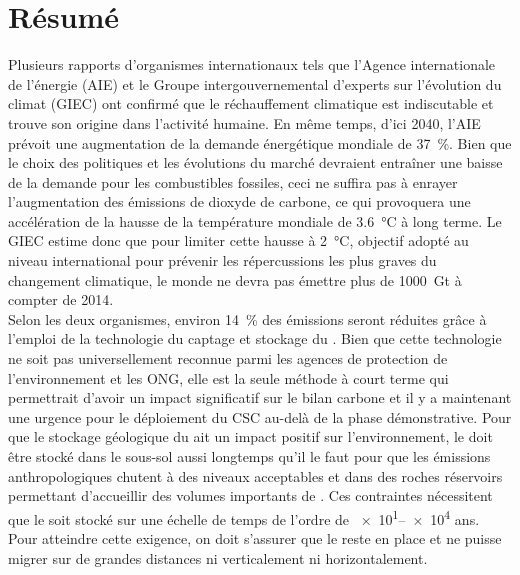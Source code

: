 \chapter*{Résumé}
\setlength{\parindent}{0cm}
\setlength{\parskip}{1em}
Plusieurs rapports d'organismes internationaux tels que l'Agence internationale
de l'énergie (AIE) et le Groupe intergouvernemental d'experts sur l’évolution du
climat (GIEC) ont confirmé que le réchauffement climatique est indiscutable et
trouve son origine dans l'activité humaine. En même temps, d'ici \num{2040},
l'AIE prévoit une augmentation de la demande énergétique mondiale de
\SI{37}{\percent}. Bien que le choix des politiques et les évolutions du marché
devraient entraîner une baisse de la demande pour les combustibles fossiles,
ceci ne suffira pas à enrayer l'augmentation des émissions de dioxyde de
carbone, ce qui provoquera une accélération de la hausse de la température
mondiale
de \SI{3.6}{\degreeCelsius} à long terme. Le GIEC estime donc que pour limiter
cette hausse à \SI{2}{\degreeCelsius}, objectif adopté au niveau international
pour prévenir les répercussions les plus graves du changement climatique, le
monde ne devra pas émettre plus de \SI{1000}{\giga\tonne}  à compter de
\num{2014}. \\
Selon les deux organismes, environ \SI{14}{\percent} des émissions seront
réduites grâce à l'emploi de la technologie du captage et stockage du .
Bien que cette technologie ne soit pas universellement reconnue parmi les
agences
de protection de l’environnement et les ONG, elle est la seule méthode à court
terme
qui permettrait d'avoir un impact significatif sur le bilan carbone et il y a
maintenant une urgence pour le déploiement du CSC au-delà de la phase
démonstrative.
Pour que le stockage géologique du  ait un impact positif sur
l'environnement, le  doit être stocké dans le sous-sol aussi longtemps
qu'il le faut pour que les émissions anthropologiques chutent à des niveaux
acceptables et dans des roches réservoirs permettant d'accueillir des volumes
importants de . Ces contraintes nécessitent que le  soit stocké
sur
une
échelle de temps de l'ordre de \numrange{e1}{e4} ans. Pour atteindre cette
exigence, on doit s'assurer que le  reste en place et ne puisse migrer
sur de grandes distances ni verticalement ni horizontalement. \par

